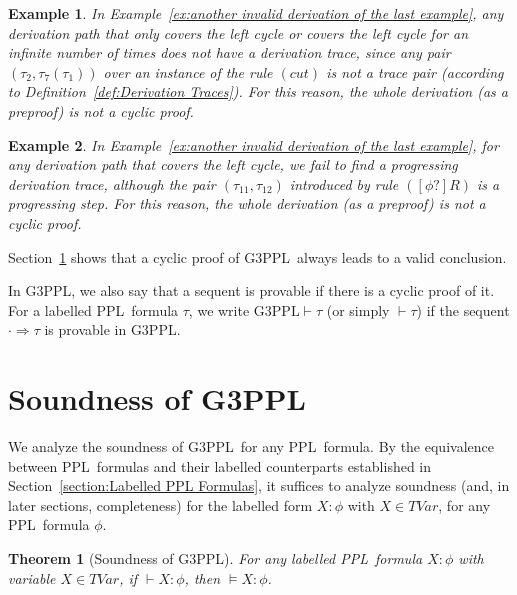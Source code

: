 \documentclass[manuscript,screen]{acmart}
\newtheorem{theorem}{Theorem}[section]
\newtheorem{example}{Example}[section]
\newcommand{\GiiiPPL}[0]{\mbox{G3PPL}}
\newcommand{\GiiiPPLcyc}[0]{\mbox{G3PPL}}
\newcommand{\TVar}[0]{\textit{TVar}}
\newcommand{\PPL}[0]{\mbox{PPL}}
\begin{document}
\begin{example}
In Example~\ref{ex:another invalid derivation of the last example}, any derivation path that only covers the left cycle or covers the left cycle for an infinite number of times does not have a derivation trace, since any pair $(\tau_2, \tau_7(\tau_1))$ over an instance of the rule $(cut)$ is not a trace pair (according to Definition~\ref{def:Derivation Traces}). 
For this reason, the whole derivation (as a preproof) is not a cyclic proof.  
\end{example}

\ifx
\begin{example}
In Example~\ref{ex:another invalid derivation of the last example}, 
for any derivation path that covers the left cycle, we fail to find a progressing derivation trace, although the pair $(\tau_{11}, \tau_{12})$ introduced by rule $([\phi?]R)$ is a progressing step. 
For this reason, the whole derivation (as a preproof) is not a cyclic proof.  
\end{example}
\fi

Section~\ref{section:Soundness of GiiiPPLcyc} shows that a cyclic proof  of \GiiiPPL\ always leads to a valid conclusion. 

In \GiiiPPL, we also say that a sequent is provable if there is a cyclic proof of it. 
For a labelled \PPL\ formula $\tau$, we write $\GiiiPPL\vdash \tau$ (or simply $\vdash \tau$) if the sequent $\cdot \Rightarrow \tau$ is provable in \GiiiPPLcyc. 

\section{Soundness of \GiiiPPLcyc}
\label{section:Soundness of GiiiPPLcyc}

We analyze the soundness of \GiiiPPLcyc\ for any \PPL\ formula. 
By the equivalence between \PPL\ formulas and their labelled counterparts established in Section~\ref{section:Labelled PPL Formulas}, it suffices to analyze soundness (and, in later sections, completeness) for the labelled form $X : \phi$ with $X\in \TVar$, for any \PPL\ formula $\phi$. 

\begin{theorem}[Soundness of \GiiiPPLcyc]
    \label{theo:Soundness of GiiiPPLcyc}
For any labelled \PPL\ formula $X : \phi$ with variable $X\in \TVar$, 
if $\vdash X : \phi$, then $\models X : \phi$. 
\end{theorem}
\end{document}

